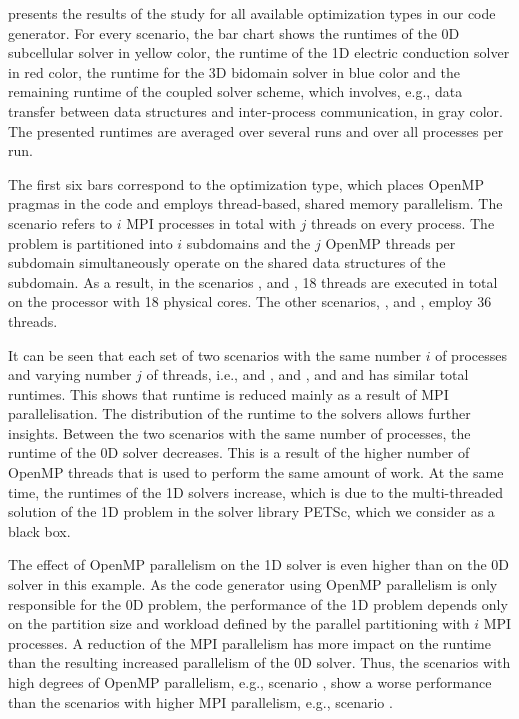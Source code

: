  presents the results of the study for all available optimization types in our code generator. For every scenario, the bar chart shows the runtimes of the 0D subcellular solver in yellow color, the runtime of the 1D electric conduction solver in red color, the runtime for the 3D bidomain solver in blue color and the remaining runtime of the coupled solver scheme, which involves, e.g., data transfer between data structures and inter-process communication, in gray color.
The presented runtimes are averaged over several runs and over all processes per run.

The first six bars correspond to the  optimization type, which places OpenMP pragmas in the code and employs thread-based, shared memory parallelism. The scenario  refers to $i$ MPI processes in total with $j$ threads on every process. The problem is partitioned into $i$ subdomains and the $j$ OpenMP threads per subdomain simultaneously operate on the shared data structures of the subdomain.
As a result, in the scenarios ,  and , 18 threads are executed in total on the processor with 18 physical cores. The other scenarios, ,  and , employ 36 threads.

It can be seen that each set of two scenarios with the same number $i$ of processes and varying number $j$ of threads, i.e.,  and ,  and , and  and  has similar total runtimes. This shows that runtime is reduced mainly as a result of MPI parallelisation. The distribution of the runtime to the solvers allows further insights. Between the two scenarios with the same number of processes, the runtime of the 0D solver decreases. This is a result of the higher number of OpenMP threads that is used to perform the same amount of work. At the same time, the runtimes of the 1D solvers increase, which is due to the multi-threaded solution of the 1D problem in the solver library PETSc, which we consider as a black box.

The effect of OpenMP parallelism on the 1D solver is even higher than on the 0D solver in this example. As the code generator using OpenMP parallelism is only responsible for the 0D problem, the performance of the 1D problem depends only on the partition size and workload defined by the parallel partitioning with $i$ MPI processes. A reduction of the MPI parallelism has more impact on the runtime than the resulting increased parallelism of the 0D solver. Thus, the scenarios with high degrees of OpenMP parallelism, e.g., scenario , show a worse performance than the scenarios with higher MPI parallelism, e.g., scenario .


